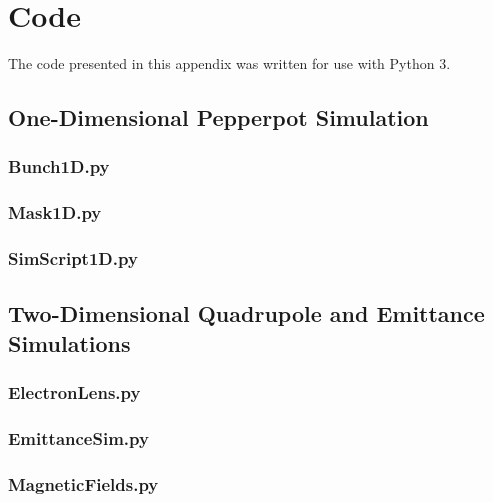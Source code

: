 \chapter{Code}\label{appendix:code}

The code presented in this appendix was written for use with Python 3.

\section{One-Dimensional Pepperpot Simulation}

\subsection{Bunch1D.py}


\subsection{Mask1D.py}


\subsection{SimScript1D.py}


\section{Two-Dimensional Quadrupole and Emittance Simulations}

\subsection{ElectronLens.py}


\subsection{EmittanceSim.py}


\subsection{MagneticFields.py}


